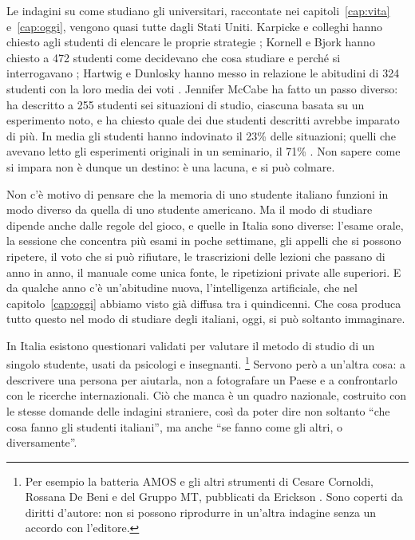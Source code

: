 Le indagini su come studiano gli universitari, raccontate nei
capitoli~\ref{cap:vita} e~\ref{cap:oggi}, vengono quasi tutte dagli
Stati Uniti. Karpicke e colleghi hanno chiesto agli studenti di elencare
le proprie strategie \parencite{karpicke2009}; Kornell e Bjork hanno
chiesto a 472 studenti come decidevano che cosa studiare e perché si
interrogavano \parencite{kornell2007}; Hartwig e Dunlosky hanno messo
in relazione le abitudini di 324 studenti con la loro media dei voti
\parencite{hartwig2012}. Jennifer McCabe ha fatto un passo diverso: ha
descritto a 255 studenti sei situazioni di studio, ciascuna basata su un
esperimento noto, e ha chiesto quale dei due studenti descritti avrebbe
imparato di più. In media gli studenti hanno indovinato il 23\% delle
situazioni; quelli che avevano letto gli esperimenti originali in un
seminario, il 71\% \parencite{mccabe2011}. Non sapere come si impara non
è dunque un destino: è una lacuna, e si può colmare.

Non c'è motivo di pensare che la memoria di uno studente italiano
funzioni in modo diverso da quella di uno studente americano. Ma il
modo di studiare dipende anche dalle regole del gioco, e quelle in
Italia sono diverse: l'esame orale, la sessione che concentra più esami
in poche settimane, gli appelli che si possono ripetere, il voto che si
può rifiutare, le trascrizioni delle lezioni che passano di anno in
anno, il manuale come unica fonte, le ripetizioni private alle superiori.
E da qualche anno c'è un'abitudine nuova, l'intelligenza artificiale,
che nel capitolo~\ref{cap:oggi} abbiamo visto già diffusa tra i
quindicenni. Che cosa produca tutto questo nel modo di studiare degli
italiani, oggi, si può soltanto immaginare.

In Italia esistono questionari validati per valutare il metodo di
studio di un singolo studente, usati da psicologi e insegnanti.%
\footnote{Per esempio la batteria AMOS e gli altri strumenti di Cesare
  Cornoldi, Rossana De Beni e del Gruppo MT, pubblicati da Erickson
  \parencite{cornoldi}. Sono coperti da diritti d'autore: non si possono
  riprodurre in un'altra indagine senza un accordo con l'editore.}
Servono
però a un'altra cosa: a descrivere una persona per aiutarla, non a
fotografare un Paese e a confrontarlo con le ricerche internazionali.
Ciò che manca è un quadro nazionale, costruito con le stesse domande
delle indagini straniere, così da poter dire non soltanto \enquote{che
cosa fanno gli studenti italiani}, ma anche \enquote{se fanno come gli
altri, o diversamente}.

